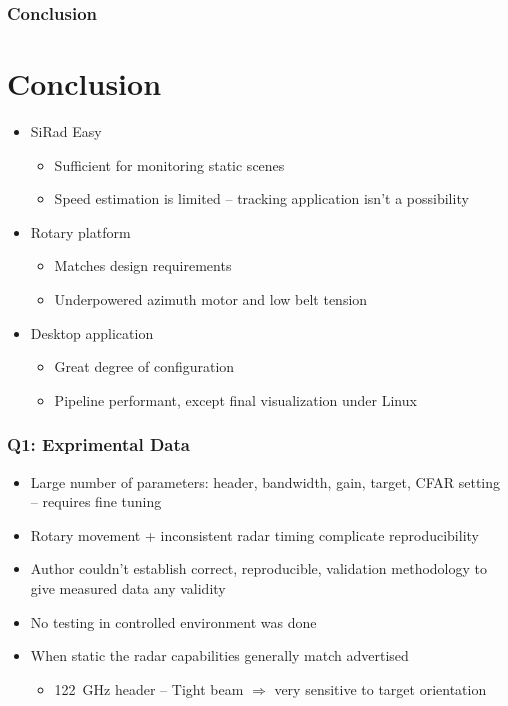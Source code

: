\documentclass[aspectratio=43]{beamer}
\begin{document}
\begin{frame}[fragile]
  \frametitle{Conclusion}
  \section{Conclusion}
  \begin{itemize}
    \item SiRad Easy
      \begin{itemize}
        \item Sufficient for monitoring static scenes
        \item Speed estimation is limited -- tracking application isn't a possibility
      \end{itemize}
    \item Rotary platform
      \begin{itemize}
        \item Matches design requirements
        \item Underpowered azimuth motor and low belt tension
      \end{itemize}
		\item Desktop application
			\begin{itemize}
				\item Great degree of configuration
				\item Pipeline performant, except final visualization under Linux
			\end{itemize}
  \end{itemize}
\end{frame}



\begin{frame}[fragile]
  \frametitle{Q1: Exprimental Data}

  \begin{itemize}
    \item Large number of parameters: header, bandwidth, gain, target, CFAR setting -- requires fine tuning
		\item Rotary movement + inconsistent radar timing complicate reproducibility
    \item Author couldn't establish correct, reproducible, validation methodology to give measured data any validity
    \item No testing in controlled environment was done
    \item When static the radar capabilities generally match advertised
      \begin{itemize}
        \item 122~GHz header -- Tight beam $\Rightarrow$ very sensitive to target orientation
      \end{itemize}
  \end{itemize}
\end{frame}
\end{document}
